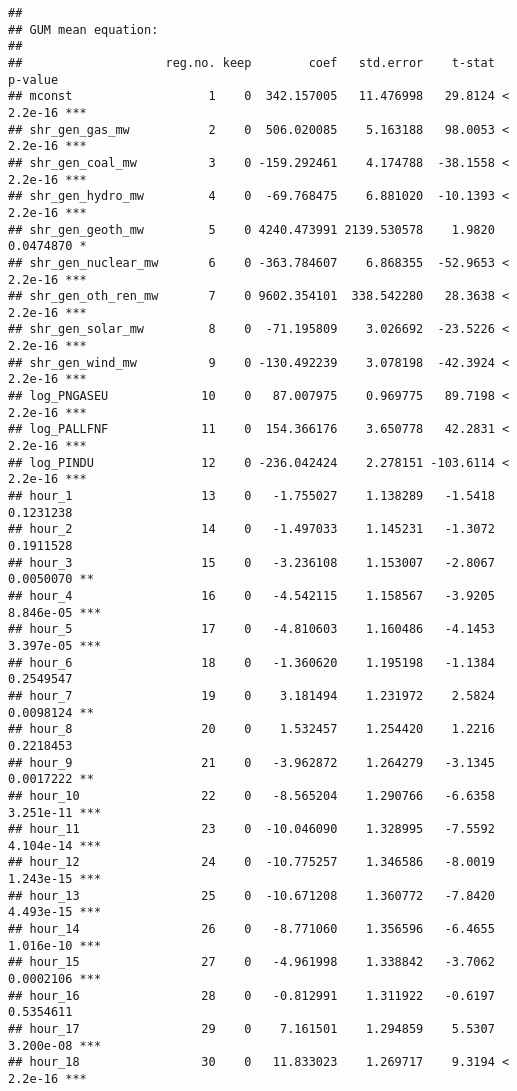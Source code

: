 \documentclass[
]{article}
\begin{document}
\begin{verbatim}
## 
## GUM mean equation:
## 
##                    reg.no. keep        coef   std.error    t-stat   p-value    
## mconst                   1    0  342.157005   11.476998   29.8124 < 2.2e-16 ***
## shr_gen_gas_mw           2    0  506.020085    5.163188   98.0053 < 2.2e-16 ***
## shr_gen_coal_mw          3    0 -159.292461    4.174788  -38.1558 < 2.2e-16 ***
## shr_gen_hydro_mw         4    0  -69.768475    6.881020  -10.1393 < 2.2e-16 ***
## shr_gen_geoth_mw         5    0 4240.473991 2139.530578    1.9820 0.0474870 *  
## shr_gen_nuclear_mw       6    0 -363.784607    6.868355  -52.9653 < 2.2e-16 ***
## shr_gen_oth_ren_mw       7    0 9602.354101  338.542280   28.3638 < 2.2e-16 ***
## shr_gen_solar_mw         8    0  -71.195809    3.026692  -23.5226 < 2.2e-16 ***
## shr_gen_wind_mw          9    0 -130.492239    3.078198  -42.3924 < 2.2e-16 ***
## log_PNGASEU             10    0   87.007975    0.969775   89.7198 < 2.2e-16 ***
## log_PALLFNF             11    0  154.366176    3.650778   42.2831 < 2.2e-16 ***
## log_PINDU               12    0 -236.042424    2.278151 -103.6114 < 2.2e-16 ***
## hour_1                  13    0   -1.755027    1.138289   -1.5418 0.1231238    
## hour_2                  14    0   -1.497033    1.145231   -1.3072 0.1911528    
## hour_3                  15    0   -3.236108    1.153007   -2.8067 0.0050070 ** 
## hour_4                  16    0   -4.542115    1.158567   -3.9205 8.846e-05 ***
## hour_5                  17    0   -4.810603    1.160486   -4.1453 3.397e-05 ***
## hour_6                  18    0   -1.360620    1.195198   -1.1384 0.2549547    
## hour_7                  19    0    3.181494    1.231972    2.5824 0.0098124 ** 
## hour_8                  20    0    1.532457    1.254420    1.2216 0.2218453    
## hour_9                  21    0   -3.962872    1.264279   -3.1345 0.0017222 ** 
## hour_10                 22    0   -8.565204    1.290766   -6.6358 3.251e-11 ***
## hour_11                 23    0  -10.046090    1.328995   -7.5592 4.104e-14 ***
## hour_12                 24    0  -10.775257    1.346586   -8.0019 1.243e-15 ***
## hour_13                 25    0  -10.671208    1.360772   -7.8420 4.493e-15 ***
## hour_14                 26    0   -8.771060    1.356596   -6.4655 1.016e-10 ***
## hour_15                 27    0   -4.961998    1.338842   -3.7062 0.0002106 ***
## hour_16                 28    0   -0.812991    1.311922   -0.6197 0.5354611    
## hour_17                 29    0    7.161501    1.294859    5.5307 3.200e-08 ***
## hour_18                 30    0   11.833023    1.269717    9.3194 < 2.2e-16 ***

\end{verbatim}
\end{document}
